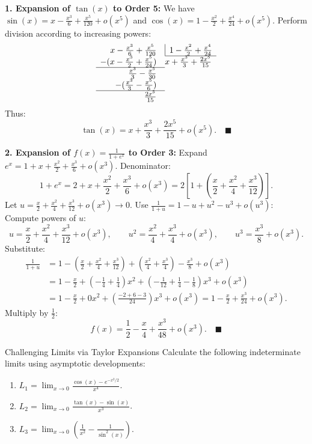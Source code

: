 \begin{solution}
\textbf{1. Expansion of $\tan(x)$ to Order 5:}
We have $\sin(x) = x - \frac{x^3}{6} + \frac{x^5}{120} + o(x^5)$ and $\cos(x) = 1 - \frac{x^2}{2} + \frac{x^4}{24} + o(x^5)$.
Perform division according to increasing powers:
\[
\begin{array}{r@{\quad}l}
x - \frac{x^3}{6} + \frac{x^5}{120} & \vline\enspace 1 - \frac{x^2}{2} + \frac{x^4}{24} \\
\cline{2-2}
-(x - \frac{x^3}{2} + \frac{x^5}{24}) & x + \frac{x^3}{3} + \frac{2x^5}{15} \\
\cline{1-1}
\frac{x^3}{3} - \frac{x^5}{30} & \\
-(\frac{x^3}{3} - \frac{x^5}{6}) & \\
\cline{1-1}
\frac{2x^5}{15} &
\end{array}
\]
Thus:
\[
\tan(x) = x + \frac{x^3}{3} + \frac{2x^5}{15} + o(x^5). \quad \blacksquare
\]

\textbf{2. Expansion of $f(x) = \frac{1}{1 + e^x}$ to Order 3:}
Expand $e^x = 1 + x + \frac{x^2}{2} + \frac{x^3}{6} + o(x^3)$.
Denominator:
\[
1 + e^x = 2 + x + \frac{x^2}{2} + \frac{x^3}{6} + o(x^3) = 2 \left[ 1 + \left( \frac{x}{2} + \frac{x^2}{4} + \frac{x^3}{12} \right) \right].
\]
Let $u = \frac{x}{2} + \frac{x^2}{4} + \frac{x^3}{12} + o(x^3) \to 0$.
Use $\frac{1}{1 + u} = 1 - u + u^2 - u^3 + o(u^3)$:
Compute powers of $u$:
\[
u = \frac{x}{2} + \frac{x^2}{4} + \frac{x^3}{12} + o(x^3), \qquad u^2 = \frac{x^2}{4} + \frac{x^3}{4} + o(x^3), \qquad u^3 = \frac{x^3}{8} + o(x^3).
\]
Substitute:
\begin{align*}
\frac{1}{1 + u} &= 1 - \left(\frac{x}{2} + \frac{x^2}{4} + \frac{x^3}{12}\right) + \left(\frac{x^2}{4} + \frac{x^3}{4}\right) - \frac{x^3}{8} + o(x^3) \\
&= 1 - \frac{x}{2} + \left(-\frac{1}{4} + \frac{1}{4}\right)x^2 + \left(-\frac{1}{12} + \frac{1}{4} - \frac{1}{8}\right)x^3 + o(x^3) \\
&= 1 - \frac{x}{2} + 0x^2 + \left(\frac{-2 + 6 - 3}{24}\right)x^3 + o(x^3) = 1 - \frac{x}{2} + \frac{x^3}{24} + o(x^3).
\end{align*}
Multiply by $\frac{1}{2}$:
\[
f(x) = \frac{1}{2} - \frac{x}{4} + \frac{x^3}{48} + o(x^3). \quad \blacksquare
\]
\end{solution}

\begin{exercise}{Challenging Limits via Taylor Expansions}
Calculate the following indeterminate limits using asymptotic developments:
\begin{enumerate}[leftmargin=1.5em,itemsep=2pt]
  \item $L_1 = \lim_{x \to 0} \frac{\cos(x) - e^{-x^2/2}}{x^4}$.
  \item $L_2 = \lim_{x \to 0} \frac{\tan(x) - \sin(x)}{x^3}$.
  \item $L_3 = \lim_{x \to 0} \left( \frac{1}{x^2} - \frac{1}{\sin^2(x)} \right)$.
\end{enumerate}
\end{exercise}

